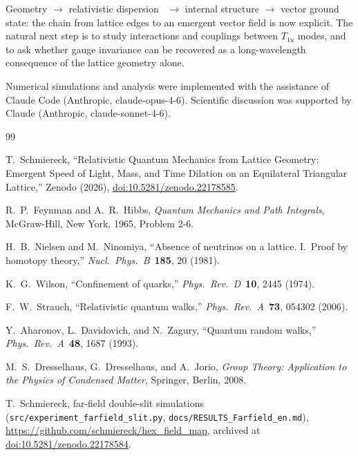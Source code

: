 \documentclass[twocolumn,showpacs,preprintnumbers,amsmath,amssymb]{revtex4-2}
\begin{document}
Geometry $\to$ relativistic dispersion~\cite{schmiereck2026} $\to$
internal structure $\to$ vector ground state: the chain from lattice
edges to an emergent vector field is now explicit.
The natural next step is to study interactions and couplings
between $T_{1u}$ modes, and to ask whether gauge invariance can be
recovered as a long-wavelength consequence of the lattice geometry
alone.

\begin{acknowledgments}
Numerical simulations and analysis were implemented with the assistance
of Claude Code (Anthropic, claude-opus-4-6).
Scientific discussion was supported by Claude (Anthropic,
claude-sonnet-4-6).
\end{acknowledgments}

\begin{thebibliography}{99}

  T.~Schmiereck,
  ``Relativistic Quantum Mechanics from Lattice Geometry:
    Emergent Speed of Light, Mass, and Time Dilation on an Equilateral
    Triangular Lattice,''
  Zenodo (2026),
  \href{https://doi.org/10.5281/zenodo.22178585}{doi:10.5281/zenodo.22178585}.

  R.~P.~Feynman and A.~R.~Hibbs,
  \emph{Quantum Mechanics and Path Integrals},
  McGraw-Hill, New York, 1965, Problem 2-6.

  H.~B.~Nielsen and M.~Ninomiya,
  ``Absence of neutrinos on a lattice. I.\ Proof by homotopy theory,''
  \emph{Nucl.\ Phys.\ B}\ \textbf{185}, 20 (1981).

  K.~G.~Wilson,
  ``Confinement of quarks,''
  \emph{Phys.\ Rev.\ D}\ \textbf{10}, 2445 (1974).

  F.~W.~Strauch,
  ``Relativistic quantum walks,''
  \emph{Phys.\ Rev.\ A}\ \textbf{73}, 054302 (2006).

  Y.~Aharonov, L.~Davidovich, and N.~Zagury,
  ``Quantum random walks,''
  \emph{Phys.\ Rev.\ A}\ \textbf{48}, 1687 (1993).

  M.~S.~Dresselhaus, G.~Dresselhaus, and A.~Jorio,
  \emph{Group Theory: Application to the Physics of Condensed Matter},
  Springer, Berlin, 2008.

  T.~Schmiereck, far-field double-slit simulations
  (\texttt{src/experiment\_farfield\_slit.py},
  \texttt{docs/RESULTS\_Farfield\_en.md}),
  \url{https://github.com/schmiereck/hex_field_map},
  archived at \href{https://doi.org/10.5281/zenodo.22178584}{doi:10.5281/zenodo.22178584}.

\end{thebibliography}
\end{document}
